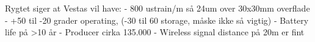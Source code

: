 Rygtet siger at Vestas vil have:
- 800 ustrain/m så 24um over 30x30mm overflade
- +50 til -20 grader operating, (-30 til 60 storage, måske ikke så vigtig)
- Battery life på >10 år
- Producer cirka 135.000
- Wireless signal distance på 20m er fint
